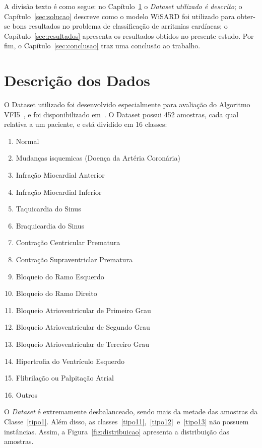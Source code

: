 \documentclass[12pt]{article}
\begin{document}
A divisão texto é como segue: no Capítulo~\ref{sec:dados} o \emph{Dataset utilizado é descrito}; o Capítulo~\ref{sec:solucao} descreve como o modelo WiSARD foi utilizado para obter-se bons resultados no problema de classificação de arritmias cardíacas; o Capítulo~\ref{sec:resultados} apresenta os resultados obtidos no presente estudo. Por fim, o Capítulo~\ref{sec:conclusao} traz uma conclusão ao trabalho.

\section{Descrição dos Dados} \label{sec:dados}

O Dataset utilizado foi desenvolvido especialmente para avaliação do Algoritmo VFI5~\cite{guvenir1997supervised}, e foi disponibilizado em~\cite{uci}. O Dataset possui 452 amostras, cada qual relativa a um paciente, e está dividido em 16 classes:
\begin{enumerate}
 \item Normal \label{tipo1}
 \item Mudanças isquemicas (Doença da Artéria Coronária)
 \item Infração Miocardial Anterior
 \item Infração Miocardial Inferior
 \item Taquicardia do Sinus
 \item Braquicardia do Sinus
 \item Contração Centricular Prematura
 \item Contração Supraventriclar Prematura
 \item Bloqueio do Ramo Esquerdo
 \item Bloqueio do Ramo Direito
 \item Bloqueio Atrioventricular de Primeiro Grau \label{tipo11}
 \item Bloqueio Atrioventricular de Segundo Grau \label{tipo12}
 \item Bloqueio Atrioventricular de Terceiro Grau \label{tipo13}
 \item Hipertrofia do Ventrículo Esquerdo
 \item Flibrilação ou Palpitação Atrial
 \item Outros
\end{enumerate}

O \emph{Dataset} é extremamente desbalanceado, sendo mais da metade das amostras da Classe~\ref{tipo1}. Além disso, as classes~\ref{tipo11},~\ref{tipo12}~e~\ref{tipo13} não possuem instâncias. Assim, a Figura~\ref{fig:distribuicao} apresenta a distribuição das amostras. 
\end{document}
